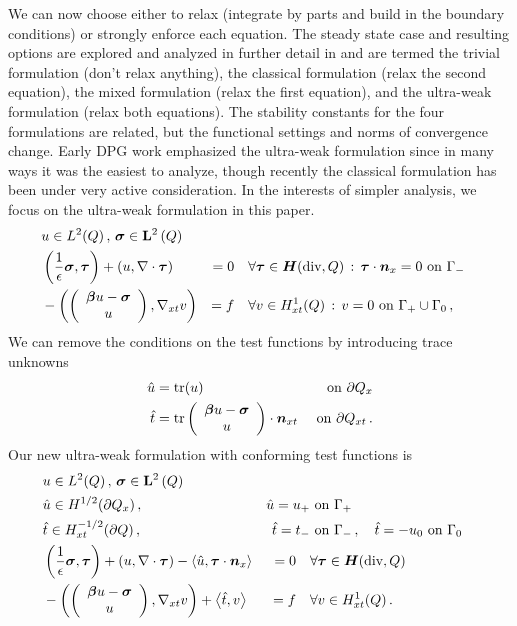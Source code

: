 \documentclass{article}
\theoremstyle{definition}
\theoremstyle{remark}
\begin{document}
We can now choose either to relax (integrate by parts and build in the boundary conditions) or strongly enforce each equation. 
The steady state case and resulting options are explored and analyzed in further detail in \cite{VariousVariational} 
and are termed the trivial formulation (don't relax anything), the classical formulation (relax the second equation), 
the mixed formulation (relax the first equation), and the ultra-weak formulation (relax both equations).
The stability constants for the four formulations are related, but the functional settings and norms of convergence change.
Early DPG work emphasized the ultra-weak formulation since in many ways it was the easiest to analyze, 
though recently the classical formulation has been under very active consideration.
In the interests of simpler analysis, we focus on the ultra-weak formulation in this paper.
\begin{equation}
\label{eq:confusionUltraWeakBF}
	\begin{aligned}
		&u\in L^2(Q)\,,\,\boldsymbol\sigma\in\mathbf{L}^2\left( Q \right)\\
		&\left( \frac{1}{\epsilon}\boldsymbol\sigma,\boldsymbol\tau \right)+\left( u,\nabla\cdot\boldsymbol\tau \right)&=0\quad&\forall\boldsymbol\tau\in\mbox{\boldmath $H$}(\text{div},Q)\,:\,\boldsymbol\tau\cdot\boldsymbol n_x=0\text{ on }\Gamma_-\\
		&-\left( \left( \begin{array}{c} \boldsymbol\beta u-\boldsymbol\sigma\\ u\\ \end{array} \right),\nabla_{xt} v \right)&=f\quad&\forall v\in H^1_{xt}(Q)\,:\,v=0\text{ on }\Gamma_+\cup\Gamma_0\,,
	\end{aligned}
\end{equation}
We can remove the conditions on the test functions by introducing trace unknowns 
\begin{align*}
\hat u&=\operatorname*{tr}(u)&\text{ on }\partial Q_x\\
\hat t&=\operatorname*{tr}\left( \begin{array}{c} \boldsymbol\beta u-\boldsymbol\sigma\\ u\\ \end{array} \right)\cdot\boldsymbol n_{xt}&\text{ on }\partial Q_{xt}\,.
\end{align*}
Our new ultra-weak formulation with conforming test functions is
\begin{equation}
\label{eq:confusionUltraWeakContinuousBF}
	\begin{aligned}
		&u\in L^2(Q)\,,\,\boldsymbol\sigma\in\mathbf{L}^2\left( Q \right)\\
		&\hat u\in H^{1/2}(\partial Q_x)\,,\,&\hat u=u_+&\text{ on }\Gamma_+\\
		&\hat t\in H^{-1/2}_{xt}(\partial Q)\,,\,&\hat t=t_-&\text{ on }\Gamma_-\,,\quad\hat t=-u_0\text{ on }\Gamma_0\\
		&\left( \frac{1}{\epsilon}\boldsymbol\sigma,\boldsymbol\tau \right)+\left( u,\nabla\cdot\boldsymbol\tau \right)-\left\langle \hat u,\boldsymbol\tau\cdot\boldsymbol n_x \right\rangle&=0\quad&\forall\boldsymbol\tau\in\mbox{\boldmath $H$}(\text{div},Q)\\
		&-\left( \left( \begin{array}{c} \boldsymbol\beta u-\boldsymbol\sigma\\ u\\ \end{array} \right),\nabla_{xt} v \right)+\left\langle \hat t,v \right\rangle&=f\quad&\forall v\in H^1_{xt}(Q)\,.
	\end{aligned}
\end{equation}
\end{document}
